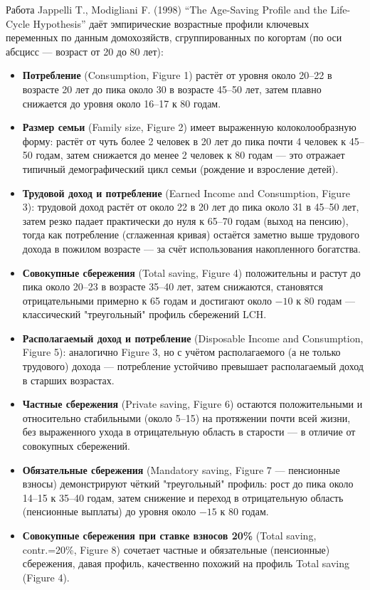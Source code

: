 \documentclass[10pt,a4paper]{article}
\begin{document}
Работа Jappelli T., Modigliani F. (1998) ``The Age-Saving Profile and the Life-Cycle Hypothesis'' даёт эмпирические возрастные профили ключевых переменных по данным домохозяйств, сгруппированных по когортам (по оси абсцисс — возраст от 20 до 80 лет):

\begin{itemize}[leftmargin=1.3em]
\item \textbf{Потребление} (Consumption, Figure 1) растёт от уровня около 20--22 в возрасте 20 лет до пика около 30 в возрасте 45--50 лет, затем плавно снижается до уровня около 16--17 к 80 годам.
\item \textbf{Размер семьи} (Family size, Figure 2) имеет выраженную колоколообразную форму: растёт от чуть более 2 человек в 20 лет до пика почти 4 человек к 45--50 годам, затем снижается до менее 2 человек к 80 годам — это отражает типичный демографический цикл семьи (рождение и взросление детей).
\item \textbf{Трудовой доход и потребление} (Earned Income and Consumption, Figure 3): трудовой доход растёт от около 22 в 20 лет до пика около 31 в 45--50 лет, затем резко падает практически до нуля к 65--70 годам (выход на пенсию), тогда как потребление (сглаженная кривая) остаётся заметно выше трудового дохода в пожилом возрасте — за счёт использования накопленного богатства.
\item \textbf{Совокупные сбережения} (Total saving, Figure 4) положительны и растут до пика около 20--23 в возрасте 35--40 лет, затем снижаются, становятся отрицательными примерно к 65 годам и достигают около $-10$ к 80 годам — классический "треугольный" профиль сбережений LCH.
\item \textbf{Располагаемый доход и потребление} (Disposable Income and Consumption, Figure 5): аналогично Figure 3, но с учётом располагаемого (а не только трудового) дохода — потребление устойчиво превышает располагаемый доход в старших возрастах.
\item \textbf{Частные сбережения} (Private saving, Figure 6) остаются положительными и относительно стабильными (около 5--15) на протяжении почти всей жизни, без выраженного ухода в отрицательную область в старости — в отличие от совокупных сбережений.
\item \textbf{Обязательные сбережения} (Mandatory saving, Figure 7 — пенсионные взносы) демонстрируют чёткий "треугольный" профиль: рост до пика около 14--15 к 35--40 годам, затем снижение и переход в отрицательную область (пенсионные выплаты) до уровня около $-15$ к 80 годам.
\item \textbf{Совокупные сбережения при ставке взносов 20\%} (Total saving, contr.=20\%, Figure 8) сочетает частные и обязательные (пенсионные) сбережения, давая профиль, качественно похожий на профиль Total saving (Figure 4).

\end{itemize}
\end{document}
